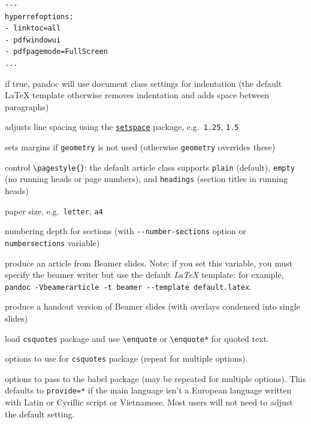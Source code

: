 \documentclass[
]{article}
\begin{document}
\begin{description}
\begin{verbatim}
---
hyperrefoptions:
- linktoc=all
- pdfwindowui
- pdfpagemode=FullScreen
...
\end{verbatim}
\item[\texttt{indent}]
if true, pandoc will use document class settings for indentation (the
default LaTeX template otherwise removes indentation and adds space
between paragraphs)
\item[\texttt{linestretch}]
adjusts line spacing using the
\href{https://ctan.org/pkg/setspace}{\texttt{setspace}} package,
e.g.~\texttt{1.25}, \texttt{1.5}
\item[\texttt{margin-left}, \texttt{margin-right}, \texttt{margin-top},
\texttt{margin-bottom}]
sets margins if \texttt{geometry} is not used (otherwise
\texttt{geometry} overrides these)
\item[\texttt{pagestyle}]
control \texttt{\textbackslash{}pagestyle\{\}}: the default article
class supports \texttt{plain} (default), \texttt{empty} (no running
heads or page numbers), and \texttt{headings} (section titles in running
heads)
\item[\texttt{papersize}]
paper size, e.g.~\texttt{letter}, \texttt{a4}
\item[\texttt{secnumdepth}]
numbering depth for sections (with \texttt{-\/-number-sections} option
or \texttt{numbersections} variable)
\item[\texttt{beamerarticle}]
produce an article from Beamer slides. Note: if you set this variable,
you must specify the beamer writer but use the default \emph{LaTeX}
template: for example,
\texttt{pandoc\ -Vbeamerarticle\ -t\ beamer\ -\/-template\ default.latex}.
\item[\texttt{handout}]
produce a handout version of Beamer slides (with overlays condensed into
single slides)
\item[\texttt{csquotes}]
load \texttt{csquotes} package and use \texttt{\textbackslash{}enquote}
or \texttt{\textbackslash{}enquote*} for quoted text.
\item[\texttt{csquotesoptions}]
options to use for \texttt{csquotes} package (repeat for multiple
options).
\item[\texttt{babeloptions}]
options to pass to the babel package (may be repeated for multiple
options). This defaults to \texttt{provide=*} if the main language isn't
a European language written with Latin or Cyrillic script or Vietnamese.
Most users will not need to adjust the default setting.
\end{description}
\end{document}
